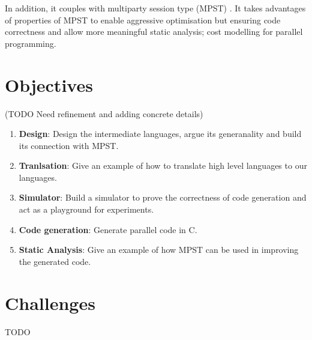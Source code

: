 In addition, it couples with multiparty session type (MPST) \cite{coppoGentleIntroductionMultiparty2015}. It takes advantages of properties of MPST to enable aggressive optimisation but ensuring code correctness and allow more meaningful static analysis; \eg cost modelling for parallel programming. %

\section{Objectives}
(TODO Need refinement and adding concrete details)
\begin{enumerate}
\item \textbf{Design}: Design the intermediate languages, argue its generanality and build its connection with MPST. 
\item \textbf{Tranlsation}: Give an example of how to translate high level languages to our languages. 
\item \textbf{Simulator}: Build a simulator to prove the correctness of code generation and act as a playground for experiments.
\item \textbf{Code generation}: Generate parallel code in C.
\item \textbf{Static Analysis}: Give an example of how MPST can be used in improving the generated code.
\end{enumerate}
\section{Challenges}
TODO
